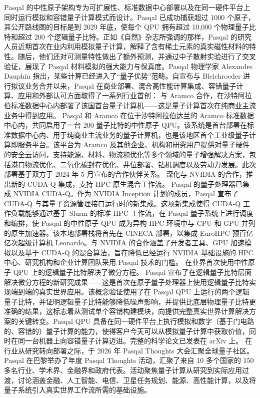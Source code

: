 \documentclass[12pt,a4paper]{ctexart}
\begin{document}
Pasqal 的中性原子架构专为可扩展性、标准数据中心部署以及在同一硬件平台上同时运行模拟和容错量子计算模式而设计。Pasqal 已成功捕获超过 1000 个原子，其公开路线图的目标是到 2029 年底，使每个 QPU 拥有超过 10,000 个物理量子比特和超过 200 个逻辑量子比特。正如《自然》杂志所强调的那样，Pasqal 的研究人员近期首次在业内利用模拟量子计算，解释了含有稀土元素的真实磁性材料的特性。随后，他们还对可测量特性做出了额外预测，并通过中子散射实验进行了交叉验证，展现了 Pasqal 材料模拟的强大能力与保真度。Pasqal 物理学家 Alexandre Dauphin 指出，某些计算已经进入了“量子优势”范畴。自宣布与 Bleichroeder 进行拟议业务合并以来，Pasqal 在商业部署、混合高性能计算集成、容错量子计算、应用和外部认可方面取得了一系列行业首创：
与 Aramco 合作，在沙特阿拉伯标准数据中心内部署了该国首台量子计算机——这是量子计算首次在纯商业主流业务中得到应用。
Pasqal 和 Aramco 在位于沙特阿拉伯达兰的 Aramco 标准数据中心内，共同启用了一台 200 量子比特的中性原子 QPU。该系统是首台部署在标准数据中心内、用于纯商业主流业务的量子计算机，也是该地区首个工业级量子计算即服务平台。该平台为 Aramco 及其他企业、机构和研究用户提供对量子硬件的安全云访问，支持能源、材料、物流和优化等多个领域的量子增强解决方案，包括港口物流优化、二氧化碳封存优化、井位部署、钻机调度以及劳动力发展。此次部署基于双方于 2024 年 5 月宣布的合作伙伴关系。
深化与 NVIDIA 的合作，推出新的 CUDA-Q 集成，支持 HPC 原生混合工作流。
Pasqal 的量子处理器已集成 NVIDIA CUDA-Q。作为 NVIDIA Inception 计划的成员，Pasqal 宣布了 CUDA-Q 与其量子资源管理接口运行时的新集成。这项新集成使得 CUDA-Q 工作负载能够通过基于 Slurm 的标准 HPC 工作流，在 Pasqal 量子系统上进行调度和编排，使 Pasqal 的中性原子 QPU 成为异构 HPC 环境中与 CPU 和 GPU 并列的原生加速器。该本地部署栈将首先在 CINECA 部署，以集成 EuroHPC 预百亿亿次超级计算机 Leonardo。与 NVIDIA 的合作涵盖了开发者工具、GPU 加速模拟以及基于 CUDA-Q 的混合算法，旨在降低已经运行 NVIDIA 基础设施的 HPC 中心、研究机构和企业计算团队采用 Pasqal 技术的门槛。
在业界首次使用中性原子 QPU 上的逻辑量子比特解决了微分方程。
Pasqal 宣布了在逻辑量子比特层面解决微分方程的新研究成果——这是首次在原子量子处理器上使用逻辑量子比特实现端到端的真实世界应用。该概念验证使用了在 Pasqal QPU 上运行的两个逻辑量子比特，并证明逻辑量子比特能够降低噪声影响，并提供比底层物理量子比特更准确的结果，这标志着从测试单个容错构建模块，向提供完整真实世界计算解决方案的关键转变。Pasqal QPU 具备在同一硬件平台上执行模拟和数字（基于门电路的、容错的）量子计算的能力，使得客户今天可以从模拟量子计算中获取价值，同时在同一台机器上向容错量子计算迈进。完整的科学论文已发表在 arXiv 上。
在行业从研究转向部署之际，于 2026 年 Pasqal Thoughts 大会汇聚全球量子社区。
Pasqal 在巴黎举办了年度 Pasqal Thoughts 活动，汇聚了来自 10 多个国家的 150 多名行业、学术界、金融界和政府代表。活动聚焦量子计算从研究到实际应用过渡，讨论涵盖金融、人工智能、电信、卫星任务规划、能源、高性能计算，以及将量子系统引入真实世界工作流所需的基础设施。
\end{document}
